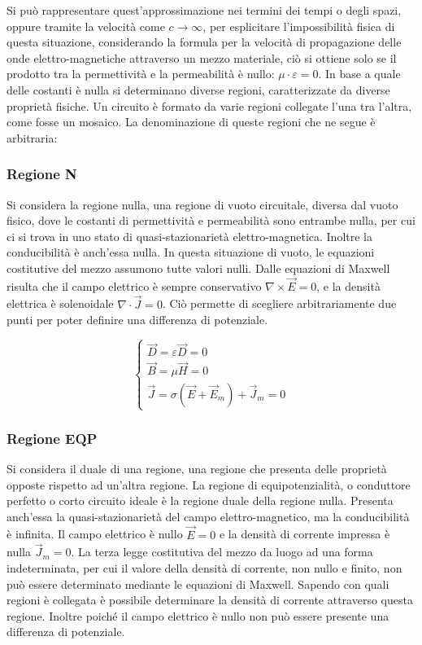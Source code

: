 \documentclass{article}
\numberwithin{equation}{subsection}
\begin{document}
Si può rappresentare quest'approssimazione 
nei termini dei tempi o degli spazi, oppure tramite la velocità come $c\to\infty$, per 
esplicitare l'impossibilità fisica di questa situazione, considerando la formula per la velocità di propagazione delle onde elettro-magnetiche attraverso un mezzo materiale, 
ciò si ottiene solo se il prodotto tra la permettività e la permeabilità è nullo: $\mu\cdot\varepsilon=0$. In base a quale delle costanti è nulla si determinano diverse 
regioni, caratterizzate da diverse proprietà fisiche. Un circuito è formato da varie regioni collegate l'una tra l'altra, come fosse un mosaico. 
La denominazione di queste regioni che ne segue è arbitraria:

\subsubsection{Regione N}
Si considera la regione nulla, una regione di vuoto circuitale, diversa dal vuoto fisico, dove le costanti di permettività e permeabilità sono entrambe nulla, per cui ci si 
trova in uno stato di quasi-stazionarietà elettro-magnetica. Inoltre la conducibilità è anch'essa nulla. In questa situazione di vuoto, le equazioni costitutive del mezzo 
assumono tutte valori nulli. Dalle equazioni di Maxwell risulta che il campo elettrico è sempre conservativo $\nabla\times\vec{E}=0$, e la densità elettrica è solenoidale $\nabla\cdot\vec{J}=0$. 
Ciò permette di scegliere arbitrariamente due punti per poter definire una differenza di potenziale. 

\begin{equation*}
    \begin{cases}
        \vec{D}=\varepsilon\vec{D}=0\\
        \vec{B}=\mu\vec{H}=0\\
        \vec{J}=\sigma(\vec{E}+\vec{E}_m)+\vec{J}_m=0
    \end{cases}
\end{equation*}

\subsubsection{Regione EQP}
Si considera il duale di una regione, una regione che presenta delle proprietà opposte rispetto ad un'altra regione. La regione di equipotenzialità, o conduttore perfetto o 
corto circuito ideale è la regione duale della regione nulla. Presenta anch'essa la quasi-stazionarietà del campo elettro-magnetico, ma la conducibilità è infinita. Il campo 
elettrico è nullo $\vec{E}=0$ e la densità di corrente impressa è nulla $\vec{J}_m=0$. La terza legge costitutiva del mezzo da 
luogo ad una forma indeterminata, per cui il valore della densità di corrente, non nullo e finito, non può essere determinato mediante le equazioni di Maxwell. Sapendo con 
quali regioni è collegata è possibile determinare la densità di corrente attraverso questa regione. Inoltre poiché il campo elettrico è nullo non può essere presente 
una differenza di potenziale. 
\end{document}
